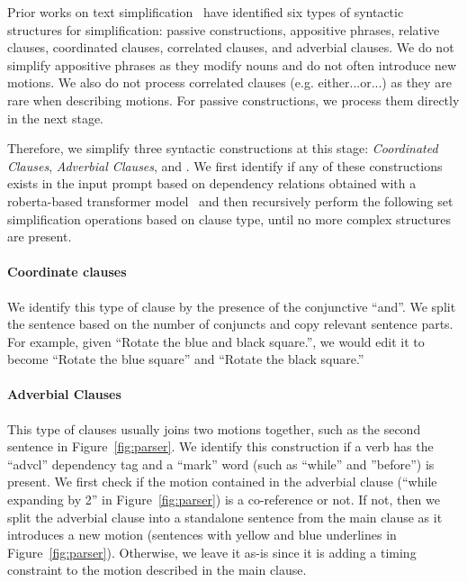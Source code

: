 %
Prior works on text
simplification~\cite{zhang2019generating, ferres2016yats} have identified six types of syntactic structures for
simplification: passive constructions, appositive phrases, relative
clauses, coordinated clauses, correlated clauses, and adverbial
clauses. 
%
We do not simplify appositive phrases as they modify nouns and do
not often introduce new motions.
We also do not process correlated
clauses (e.g. either...or...) as they are rare when describing
motions.   For passive constructions, we process them directly in the
next stage. 

Therefore, we simplify three syntactic constructions at this stage:
\textit{Coordinated Clauses}, \textit{Adverbial Clauses}, and
.  We first identify if any of these
constructions exists in the input prompt based on dependency relations
obtained with a roberta-based transformer
model~\cite{liu2019roberta, honnibal2020spacy} and then recursively perform the
following set simplification operations based on clause type, until no
more complex structures are present.

\paragraph{Coordinate clauses} We identify this type of clause by the presence of the conjunctive ``and''. 
We split the sentence based on the number of conjuncts and copy relevant sentence parts. For example, given ``Rotate the blue and black square.'', we would edit it to become ``Rotate the blue square'' and ``Rotate the black square.''

\paragraph{Adverbial Clauses}
This type of clauses usually joins two motions together, such as the
second sentence in Figure~\ref{fig:parser}.  We identify this
construction if a verb has the ``advcl'' dependency tag and a ``mark''
word (such as ``while'' and ''before'') is present. 
%
We first check if the motion contained in the adverbial clause (``while expanding by 2'' in Figure~\ref{fig:parser}) is a co-reference or not.  
If not, then we split the adverbial clause into a standalone sentence from the main clause as it introduces a new motion (sentences with yellow and blue underlines in Figure~\ref{fig:parser}).
Otherwise, we leave it as-is since it is adding a timing constraint to the motion described in the main clause.

